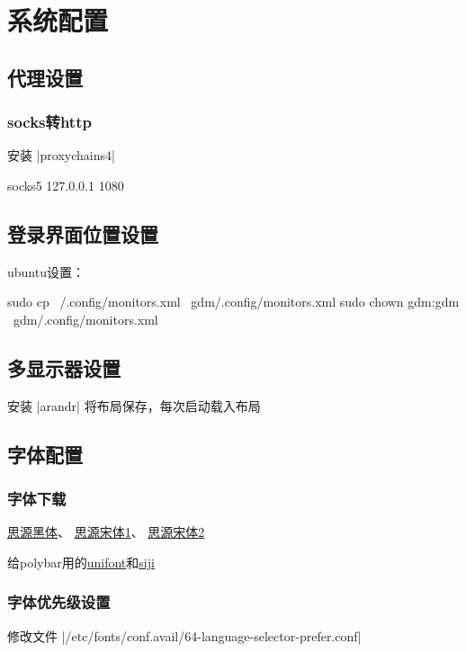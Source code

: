\section{系统配置}

\subsection{代理设置}
\subsubsection{socks转http}
安装 |proxychains4|
\begin{mysh}
  socks5 127.0.0.1 1080
\end{mysh}

\subsection{登录界面位置设置}
ubuntu设置：
\begin{mysh}
sudo cp ~/.config/monitors.xml ~gdm/.config/monitors.xml
sudo chown gdm:gdm ~gdm/.config/monitors.xml
\end{mysh}

\subsection{多显示器设置}
安装 |arandr| 将布局保存，每次启动载入布局

\subsection{字体配置}
\subsubsection*{字体下载}
\href{https://github.com/adobe-fonts/source-han-sans/raw/release/OTF/SourceHanSansSC.zip}
{思源黑体}、
\href{https://github.com/adobe-fonts/source-han-serif/raw/release/OTF/SourceHanSerifSC_EL-M.zip}
{思源宋体1}、
\href{https://github.com/adobe-fonts/source-han-serif/raw/release/OTF/SourceHanSerifSC_SB-H.zip}
{思源宋体2}

给polybar用的\href{https://unifoundry.com/pub/unifont/unifont-13.0.05/font-builds/unifont-13.0.05.ttf}
{unifont}和\href{https://unifoundry.com/pub/unifont/unifont-13.0.05/font-builds/unifont-13.0.05.ttf}
{siji}

\subsubsection*{字体优先级设置}
修改文件 |/etc/fonts/conf.avail/64-language-selector-prefer.conf|
